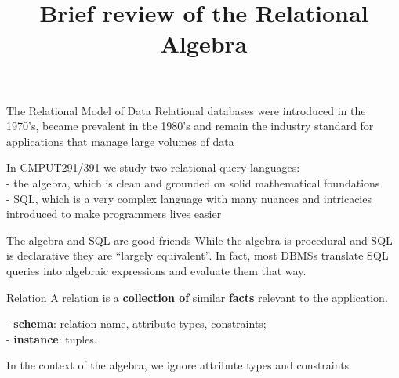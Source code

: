 \documentclass[xcolor={usenames,dvipsnames}]{beamer}
\title{Brief review of the Relational Algebra}
\begin{document}






\frame{\maketitle}

%
%
\begin{frame}{The Relational Model of Data}
Relational databases were introduced in the 1970's, became prevalent in the 1980's and remain the industry standard for applications that manage large volumes of data

In CMPUT291/391 we study two relational query languages:\\
 - the algebra, which is clean and grounded on solid mathematical foundations\\
 - SQL, which is a very complex language with many nuances and intricacies introduced to make programmers lives easier

\begin{BOX}{The algebra and SQL are good friends}
While the algebra is procedural and SQL is declarative they are ``largely equivalent''. In fact, most DBMSs translate SQL queries into algebraic expressions and evaluate them that way.
\end{BOX}
\end{frame}

%
%
\begin{frame}

\begin{BOX}{Relation}
A relation is a \textbf{collection of} similar \textbf{facts} relevant to the application.

- \textbf{schema}: relation name, attribute types, constraints;\\
- \textbf{instance}: tuples.
\end{BOX}

In the context of the algebra, we ignore attribute types and constraints

\usebox{\MovieTable}
\end{frame}
\end{document}
